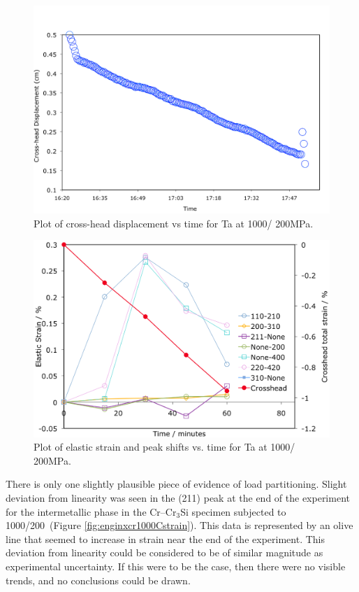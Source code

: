 \begin{figure}[H]
\begin{center}
\includegraphics[width=11.5cm]{enginxsanta1000C200MPa}
\vspace{-2mm}
\caption{Plot of cross-head displacement vs time for Ta at 1000\celsius/ 200MPa.}\label{fig:enginxsanta1000C200MPa}
\end{center}
\end{figure}  
%
%
\begin{figure}[H]
\begin{center}
\includegraphics[width=16cm]{enginxsanta1000C200MPastrain}
\vspace{-2mm}
\caption{Plot of elastic strain and peak shifts vs. time for Ta at 1000\celsius/ 200MPa.}\label{fig:enginxsanta1000C200MPastrain}
\end{center}
\end{figure}  
%

There is only one slightly plausible piece of evidence of load partitioning.  Slight deviation from linearity was seen in the (211) peak at the end of the experiment for the intermetallic phase in the Cr--Cr$_3$Si specimen subjected to 1000\celsius/200\mega\pascal\ (Figure \ref{fig:enginxcr1000Cstrain}).  This data is represented by an olive line that seemed to increase in strain near the end of the experiment.  This deviation from linearity could be considered to be of similar magnitude as experimental uncertainty.  If this were to be the case, then there were no visible trends, and no conclusions could be drawn.

